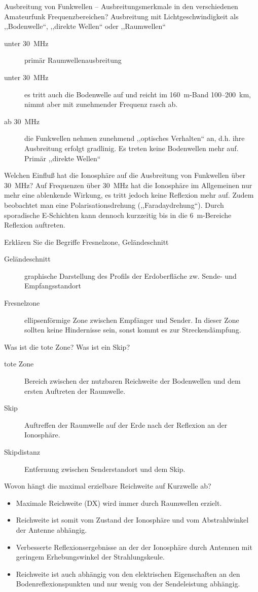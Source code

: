 \documentclass[avery5371,grid,frame,a4paper]{flashcards}
\newcommand{\card}[3]{
  \begin{flashcard}[{\chap} -- #1]{#2}#3\end{flashcard}
}
\begin{document}
\card{13}{Ausbreitung von Funkwellen -- Ausbreitungsmerkmale in den verschiedenen Amateurfunk Frequenzbereichen?}{
  \small
  Ausbreitung mit Lichtgeschwindigkeit als ,,Bodenwelle``, ,,direkte Wellen`` oder ,,Raumwellen``
  \begin{description}
    \item[unter \SI{30}{\mega\Hz}] primär Raumwellenausbreitung
    \item[unter \SI{30}{\mega\Hz}] es tritt auch die Bodenwelle auf und reicht im \SI{160}{\metre}-Band 100--200~km, nimmt aber mit zunehmender Frequenz rasch ab.
    \item[ab \SI{30}{\mega\Hz}] die Funkwellen nehmen zunehmend ,,optisches Verhalten`` an, d.h. ihre Ausbreitung erfolgt gradlinig. Es treten keine Bodenwellen mehr auf. Primär ,,direkte Wellen``
  \end{description}
}
\card{14}{Welchen Einfluß hat die Ionosphäre auf die Ausbreitung von Funkwellen über \SI{30}{\mega\Hz}?}{
  Auf Frequenzen über \SI{30}{\mega\Hz} hat die Ionosphäre im Allgemeinen nur mehr eine ablenkende Wirkung, es tritt jedoch keine Reflexion mehr auf. Zudem beobachtet man eine Polarisationsdrehung (,,Faradaydrehung``). Durch sporadische E-Schichten kann dennoch kurzzeitig bis in die 6~m-Bereiche Reflexion auftreten.
}
\card{15}{Erklären Sie die Begriffe Fresnelzone, Geländeschnitt}{
  \begin{description}
  \item[Geländeschnitt] graphische Darstellung des Profils der Erdoberfläche zw. Sende- und Empfangsstandort
  \item[Fresnelzone] ellipsenförmige Zone zwischen Empfänger und Sender. In dieser Zone sollten keine Hindernisse sein, sonst kommt es zur Streckendämpfung.
  \end{description}
}
\card{16}{Was ist die tote Zone? Was ist ein Skip?}{
  \begin{description}
    \item[tote Zone] Bereich zwischen der nutzbaren Reichweite der Bodenwellen und dem ersten Auftreten der Raumwelle.
    \item[Skip] Auftreffen der Raumwelle auf der Erde nach der Reflexion an der Ionosphäre.
    \item[Skipdistanz] Entfernung zwischen Senderstandort und dem Skip.
  \end{description}
}
\card{17}{Wovon hängt die maximal erzielbare Reichweite auf Kurzwelle ab?}{
  \small
  \begin{itemize}
    \item Maximale Reichweite (DX) wird immer durch Raumwellen erzielt.
    \item Reichweite ist somit vom Zustand der Ionosphäre und vom Abstrahlwinkel der Antenne abhängig.
    \item Verbesserte Reflexionsergebnisse an der der Ionosphäre durch Antennen mit geringem Erhebungswinkel der Strahlungskeule.
    \item Reichweite ist auch abhängig von den elektrischen Eigenschaften an den Bodenreflexionspunkten und nur wenig von der Sendeleistung abhängig.
  \end{itemize}
}
\end{document}

